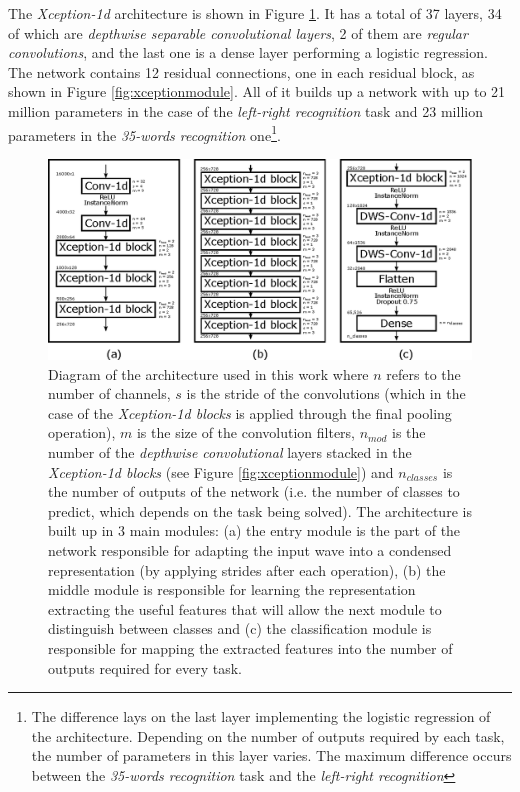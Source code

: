 \documentclass{elsarticle}
\begin{document}
The \textit{Xception-1d} architecture is shown in Figure \ref{fig:arch}. It has a total of 37 layers, 34 of which are \textit{depthwise separable convolutional layers}, 2 of them are \textit{regular convolutions}, and the last one is a dense layer performing a logistic regression. The network contains 12 residual connections, one in each residual block, as shown in Figure \ref{fig:xceptionmodule}. All of it builds up a network with up to 21 million parameters in the case of the \textit{left-right recognition}  task and 23 million parameters in the \textit{35-words recognition} one\footnote{The difference lays on the last layer implementing the logistic regression of the architecture. Depending on the number of outputs required by each task, the number of parameters in this layer varies. The maximum difference occurs between the \textit{35-words recognition} task and the \textit{left-right recognition}}.

\begin{figure}[ht]
	\centering
	\includegraphics[width=1.0\linewidth]{img/arch.eps}
	\caption{Diagram of the architecture used in this work where $n$ refers to the number of channels, $s$ is the stride of the convolutions (which in the case of the \textit{Xception-1d blocks} is applied through the final pooling operation), $m$ is the size of the convolution filters, $n_{mod}$ is the number of the \textit{depthwise convolutional} layers stacked in the \textit{Xception-1d blocks} (see Figure \ref{fig:xceptionmodule}) and $n_{classes}$ is the number of outputs of the network (i.e. the number of classes to predict, which depends on the task being solved). The architecture is built up in 3 main modules: (a) the entry module is the part of the network responsible for adapting the input wave into a condensed representation (by applying strides after each operation), (b) the middle module is responsible for learning the representation extracting the useful features that will allow the next module to distinguish between classes and (c) the classification module is responsible for mapping the extracted features into the number of outputs required for every task.}
	\label{fig:arch}
\end{figure}
\end{document}
